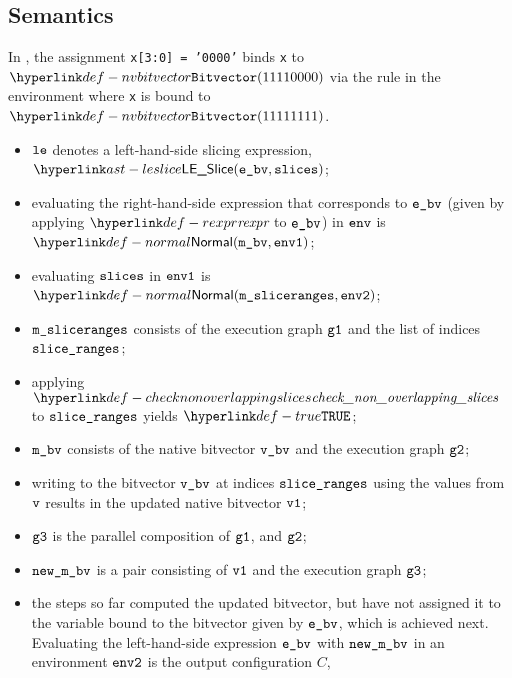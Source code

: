 \subsection{Semantics}
In , the assignment \texttt{x[3:0] = '0000'} binds
\texttt{x} to $\nvbitvector(11110000)$
via the rule 
in the environment where \texttt{x} is bound to $\nvbitvector(11111111)$.


\ProseParagraph
\AllApply
\begin{itemize}
  \item $\texttt{le}$ denotes a left-hand-side slicing expression, $\LESlice(\ebv, \slices)$;
  \item evaluating the right-hand-side expression that corresponds to $\texttt{e\_bv}$
  (given by applying $\torexpr$ to $\texttt{e\_bv}$) in $\texttt{env}$
    is $\Normal(\mbv,\envone)$\ProseOrAbnormal;
  \item evaluating $\texttt{slices}$ in $\texttt{env1}$ is $\Normal(\msliceranges, \envtwo)$\ProseOrAbnormal;
  \item $\texttt{m\_sliceranges}$ consists of the execution graph $\texttt{g1}$ and the list of indices\\
         $\texttt{slice\_ranges}$;
  \item applying $\checknonoverlappingslices$ to $\texttt{slice\_ranges}$ yields $\True$\ProseOrError;
  \item $\texttt{m\_bv}$ consists of the native bitvector $\texttt{v\_bv}$ and the execution graph $\texttt{g2}$;
  \item writing to the bitvector $\texttt{v\_bv}$ at indices $\texttt{slice\_ranges}$ using the values from $\texttt{v}$
  results in the updated native bitvector $\texttt{v1}$\ProseOrError;
  \item $\texttt{g3}$ is the parallel composition of $\texttt{g1}$, and $\texttt{g2}$;
  \item $\texttt{new\_m\_bv}$ is a pair consisting of $\texttt{v1}$ and the execution graph $\texttt{g3}$;
  \item the steps so far computed the updated bitvector, but have not assigned it to the
  variable bound to the bitvector given by $\texttt{e\_bv}$, which is achieved next.
  Evaluating the left-hand-side expression $\texttt{e\_bv}$ with
  $\texttt{new\_m\_bv}$ in an environment $\texttt{env2}$ is the output configuration $C$,
\end{itemize}
\FormallyParagraph
